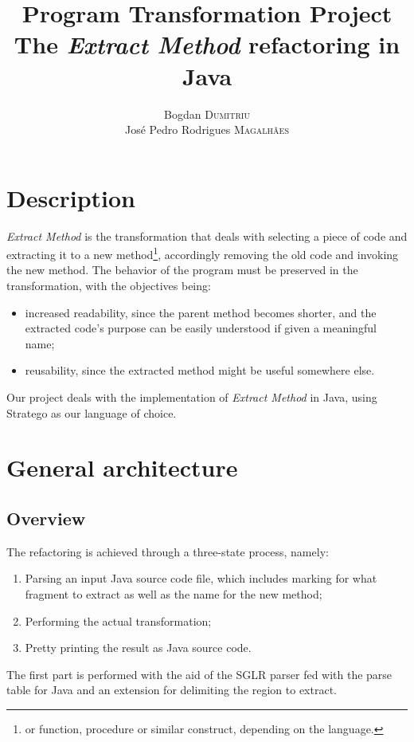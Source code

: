 \documentclass[a4paper,10pt]{article}
\title{Program Transformation Project\\The \emph{Extract Method} refactoring in Java}
\author{Bogdan \textsc{Dumitriu}\\Jos\'e Pedro Rodrigues \textsc{Magalh\~aes}}
\begin{document}
\maketitle

\section{Description}
\emph{Extract Method} is the transformation that deals with
selecting a piece of code and extracting it to a new
method\footnote{or function, procedure or similar construct,
depending on the language.}, accordingly removing the old code and
invoking the new method. The behavior of the program must be
preserved in the transformation, with the objectives being:
\begin{itemize}
\item increased readability, since the parent method becomes
shorter, and the extracted code's purpose can be easily understood
if given a meaningful name;
\item reusability, since the extracted method might be useful somewhere
else.
\end{itemize}

Our project deals with the implementation of \emph{Extract Method}
in Java, using Stratego \cite{stratego} as our language of choice.

\section{General architecture}

\subsection{Overview}
The refactoring is achieved through a three-state process, namely:

\begin{enumerate}

\item Parsing an input Java source code file, which includes marking
for what fragment to extract as well as the name for the new method;

\item Performing the actual transformation;

\item Pretty printing the result as Java source code.

\end{enumerate}

The first part is performed with the aid of the SGLR parser fed with the
parse table for Java and an extension for delimiting the region to extract.
\end{document}
